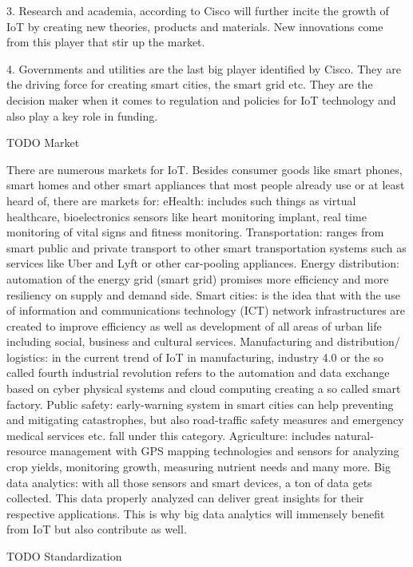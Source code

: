		3. Research and academia, according to Cisco will further incite the growth of IoT by creating new theories, products and materials. New innovations come from this player that stir up the market.

		4. Governments and utilities are the last big player identified by Cisco. They are the driving force for creating smart cities, the smart grid etc. They are the decision maker when it comes to regulation and policies for IoT technology and also play a key role in funding.
		
		TODO Market

		There are numerous markets for IoT. Besides consumer goods like smart phones, smart homes and other smart appliances that most people already use or at least heard of, there are markets for:
		eHealth:  includes such things as virtual healthcare, bioelectronics sensors  like heart monitoring implant, real time monitoring of vital signs and fitness monitoring.
		Transportation:  ranges from smart public and private transport to other smart transportation systems such as services like Uber and Lyft or other car-pooling appliances. 
		Energy distribution: automation of the energy grid (smart grid) promises more efficiency and more resiliency on supply and demand side.
		Smart cities: is the idea that with the use of information and communications technology (ICT) network infrastructures are created to improve efficiency as well as development of all areas of urban life including social, business and cultural services.
		Manufacturing and distribution/ logistics: in the current trend of IoT in manufacturing, industry 4.0 or the so called fourth industrial revolution refers to the automation and data exchange based on cyber physical systems and cloud computing creating a so called smart factory. 
		Public safety: early-warning system in smart cities can help preventing and mitigating catastrophes, but also road-traffic safety measures and emergency medical services etc. fall under this category.
		Agriculture: includes natural-resource management with GPS mapping technologies and sensors for analyzing crop yields, monitoring growth, measuring nutrient needs and many more.
		Big data analytics: with all those sensors and smart devices, a ton of data gets collected. This data properly analyzed can deliver great insights for their respective applications. This is why big data analytics will immensely benefit from IoT but also contribute as well.

		TODO Standardization

